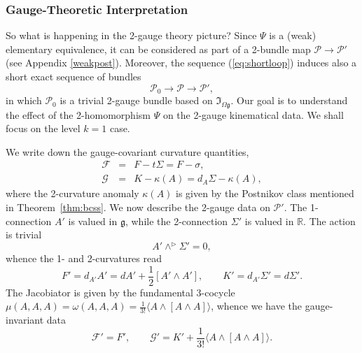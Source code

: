 \documentclass[onecolumn]{article}
\theoremstyle{theorem}
\theoremstyle{remark}
\theoremstyle{example}
\theoremstyle{definition}
\numberwithin{equation}{section}
\begin{document}
\subsubsection{Gauge-Theoretic Interpretation} 
So what is happening in the 2-gauge theory picture? Since $\Psi$ is a (weak) elementary equivalence, it can be considered as part of a 2-bundle map $\mathcal{P}\rightarrow\mathcal{P}'$ (see Appendix \ref{weakpost}). Moreover, the sequence  (\ref{eq:shortloop}) induces also a short exact sequence of bundles
\begin{equation}
    \mathcal{P}_0\rightarrow\mathcal{P}\rightarrow\mathcal{P}',\nonumber
\end{equation}
in which $\mathcal{P}_0$ is a trivial 2-gauge bundle based on $\mathfrak{I}_{\Omega\mathfrak{g}}$. Our goal is to understand the effect of the 2-homomorphism $\Psi$ on the 2-gauge kinematical data. We shall focus on the level $k=1$ case.

We write down the gauge-covariant curvature quantities,
\begin{eqnarray}
    \mathcal{F} &=& F - t\Sigma = F - \sigma,\nonumber\\ 
    \mathcal{G} &=& K - \kappa(A) = d_A\Sigma - \kappa(A),\nonumber
\end{eqnarray}
where the 2-curvature anomaly $\kappa(A)$ is given by the Postnikov class mentioned in \linebreak Theorem~\ref{thm:bcss}. We now describe the 2-gauge data on $\mathcal{P}'$. The 1-connection $A'$ is valued in $\mathfrak{g}$, while the 2-connection $\Sigma'$ is valued in $\mathbb{R}$. The action is trivial
\begin{equation}
    A'\wedge^\rhd \Sigma' = 0,\nonumber
\end{equation}
whence the 1- and 2-curvatures read
\begin{equation}
    F' = d_{A'}A' = dA' + \frac{1}{2}[A'\wedge A'],\qquad K' = d_{A'}\Sigma' = d\Sigma'.\nonumber
\end{equation}
{The} Jacobiator is given by the fundamental 3-cocycle $\mu(A,A,A) = \omega(A,A,A)= \frac{1}{3!}\langle A\wedge[A\wedge A]\rangle$, whence we have the gauge-invariant data
\begin{equation}
    \mathcal{F}' = F',\qquad \mathcal{G}' = K' + \frac{1}{3!}\langle A\wedge [A\wedge A]\rangle.\nonumber
\end{equation}

\end{document}
